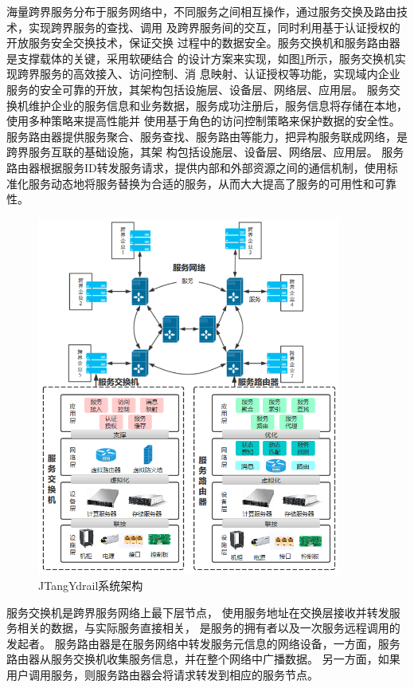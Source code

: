   海量跨界服务分布于服务网络中，不同服务之间相互操作，通过服务交换及路由技术，实现跨界服务的查找、调用
  及跨界服务间的交互，同时利用基于认证授权的开放服务安全交换技术，保证交换
  过程中的数据安全。服务交换机和服务路由器是支撑载体的关键，采用软硬结合
  的设计方案来实现，如图\ref{fig:system}所示，服务交换机实现跨界服务的高效接入、访问控制、消
  息映射、认证授权等功能，实现域内企业服务的安全可靠的开放，其架构包括设施层、设备层、网络层、应用层\cite{zheng2020service}。
  服务交换机维护企业的服务信息和业务数据，服务成功注册后，服务信息将存储在本地，使用多种策略来提高性能并
  使用基于角色的访问控制策略来保护数据的安全性。
  服务路由器提供服务聚合、服务查找、服务路由等能力，把异构服务联成网络，是跨界服务互联的基础设施，其架
  构包括设施层、设备层、网络层、应用层。
  服务路由器根据服务ID转发服务请求，提供内部和外部资源之间的通信机制，使用标准化服务动态地将服务替换为合适的服务，从而大大提高了服务的可用性和可靠性。
  \begin{figure}[htbp]
    \centering
    \includegraphics[width=10cm]{./images/system.png}
    \caption{JTangYdrail系统架构\cite{zheng2020service}}
    \label{fig:system}
  \end{figure}

  服务交换机是跨界服务网络上最下层节点，
  使用服务地址在交换层接收并转发服务相关的数据，与实际服务直接相关，
  是服务的拥有者以及一次服务远程调用的发起者。
    服务路由器是在服务网络中转发服务元信息的网络设备，一方面，服务路由器从服务交换机收集服务信息，并在整个网络中广播数据。 
    另一方面，如果用户调用服务，则服务路由器会将请求转发到相应的服务节点。 

